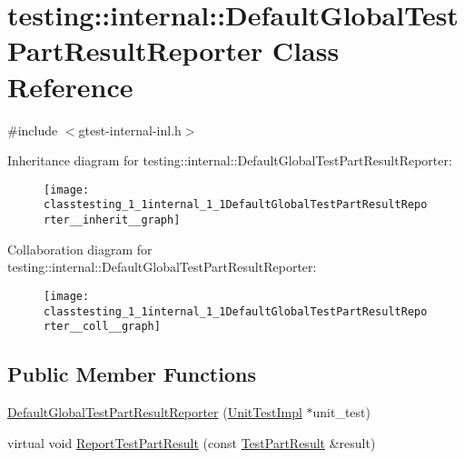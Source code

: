 \hypertarget{classtesting_1_1internal_1_1DefaultGlobalTestPartResultReporter}{}\section{testing\+:\+:internal\+:\+:Default\+Global\+Test\+Part\+Result\+Reporter Class Reference}
\label{classtesting_1_1internal_1_1DefaultGlobalTestPartResultReporter}


{\ttfamily \#include $<$gtest-\/internal-\/inl.\+h$>$}



Inheritance diagram for testing\+:\+:internal\+:\+:Default\+Global\+Test\+Part\+Result\+Reporter\+:
\nopagebreak
\begin{figure}[H]
\begin{center}
\leavevmode
\texttt{[image: classtesting\_1\_1internal\_1\_1DefaultGlobalTestPartResultReporter\_\_inherit\_\_graph]}
\end{center}
\end{figure}


Collaboration diagram for testing\+:\+:internal\+:\+:Default\+Global\+Test\+Part\+Result\+Reporter\+:
\nopagebreak
\begin{figure}[H]
\begin{center}
\leavevmode
\texttt{[image: classtesting\_1\_1internal\_1\_1DefaultGlobalTestPartResultReporter\_\_coll\_\_graph]}
\end{center}
\end{figure}
\subsection*{Public Member Functions}
\begin{DoxyCompactItemize}
\item 
\hyperlink{classtesting_1_1internal_1_1DefaultGlobalTestPartResultReporter_a3900ea7f34b34afd48c7d1d0312a1488}{Default\+Global\+Test\+Part\+Result\+Reporter} (\hyperlink{classtesting_1_1internal_1_1UnitTestImpl}{Unit\+Test\+Impl} $\ast$unit\+\_\+test)
\item 
virtual void \hyperlink{classtesting_1_1internal_1_1DefaultGlobalTestPartResultReporter_a6081576a23b964cfecab1e424d8044fc}{Report\+Test\+Part\+Result} (const \hyperlink{classtesting_1_1TestPartResult}{Test\+Part\+Result} \&result)
\end{DoxyCompactItemize}


